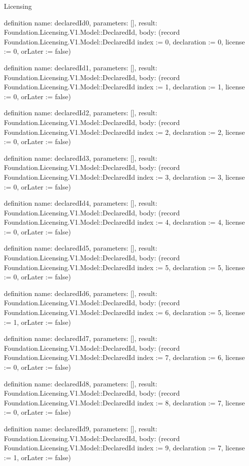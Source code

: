 \begin{lexlean}{Licensing}
\begin{semanticmodule}
definition{
  name: declaredId0,
  parameters: [],
  result: Foundation.Licensing.V1.Model::DeclaredId,
  body: (record Foundation.Licensing.V1.Model::DeclaredId {index := 0, declaration := 0, license := 0, orLater := false})
}

definition{
  name: declaredId1,
  parameters: [],
  result: Foundation.Licensing.V1.Model::DeclaredId,
  body: (record Foundation.Licensing.V1.Model::DeclaredId {index := 1, declaration := 1, license := 0, orLater := false})
}

definition{
  name: declaredId2,
  parameters: [],
  result: Foundation.Licensing.V1.Model::DeclaredId,
  body: (record Foundation.Licensing.V1.Model::DeclaredId {index := 2, declaration := 2, license := 0, orLater := false})
}

definition{
  name: declaredId3,
  parameters: [],
  result: Foundation.Licensing.V1.Model::DeclaredId,
  body: (record Foundation.Licensing.V1.Model::DeclaredId {index := 3, declaration := 3, license := 0, orLater := false})
}

definition{
  name: declaredId4,
  parameters: [],
  result: Foundation.Licensing.V1.Model::DeclaredId,
  body: (record Foundation.Licensing.V1.Model::DeclaredId {index := 4, declaration := 4, license := 0, orLater := false})
}

definition{
  name: declaredId5,
  parameters: [],
  result: Foundation.Licensing.V1.Model::DeclaredId,
  body: (record Foundation.Licensing.V1.Model::DeclaredId {index := 5, declaration := 5, license := 0, orLater := false})
}

definition{
  name: declaredId6,
  parameters: [],
  result: Foundation.Licensing.V1.Model::DeclaredId,
  body: (record Foundation.Licensing.V1.Model::DeclaredId {index := 6, declaration := 5, license := 1, orLater := false})
}

definition{
  name: declaredId7,
  parameters: [],
  result: Foundation.Licensing.V1.Model::DeclaredId,
  body: (record Foundation.Licensing.V1.Model::DeclaredId {index := 7, declaration := 6, license := 0, orLater := false})
}

definition{
  name: declaredId8,
  parameters: [],
  result: Foundation.Licensing.V1.Model::DeclaredId,
  body: (record Foundation.Licensing.V1.Model::DeclaredId {index := 8, declaration := 7, license := 0, orLater := false})
}

definition{
  name: declaredId9,
  parameters: [],
  result: Foundation.Licensing.V1.Model::DeclaredId,
  body: (record Foundation.Licensing.V1.Model::DeclaredId {index := 9, declaration := 7, license := 1, orLater := false})
}


\end{semanticmodule}
\end{lexlean}
